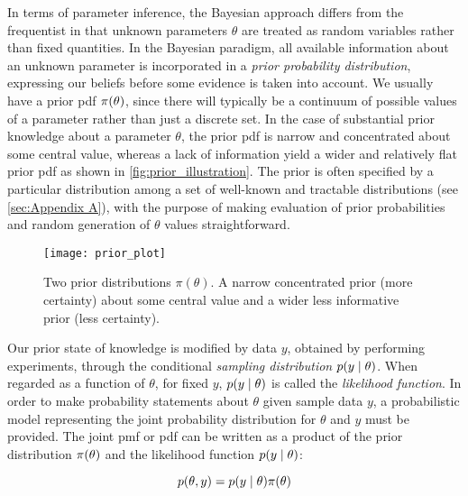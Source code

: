 In terms of parameter inference, the Bayesian approach differs from the frequentist in that unknown parameters $\theta$ are treated as random variables rather than fixed quantities. In the Bayesian paradigm, all available information about an unknown parameter is incorporated in a \textit{prior probability distribution}, expressing our beliefs before some evidence is taken into account. We usually have a prior pdf $\pi \qty(\theta)$, since there will typically be a continuum of possible values of a parameter rather than just a discrete set. In the case of substantial prior knowledge about a parameter $\theta$, the prior pdf is narrow and concentrated about some central value, whereas a lack of information yield a wider and relatively flat prior pdf as shown in \autoref{fig:prior_illustration}. The prior is often specified by a particular distribution among a set of well-known and tractable distributions (see \autoref{sec:Appendix A}), with the purpose of making evaluation of prior probabilities and random generation of $\theta$ values straightforward.



\begin{figure}[H]
    \centering
    \texttt{[image: prior\_plot]}
    \caption{Two prior distributions $\pi (\theta)$. A narrow concentrated prior (more certainty) about some central value and a wider less informative prior (less certainty).}
    \label{fig:prior_illustration}
\end{figure}

Our prior state of knowledge is modified by data $y$, obtained by performing experiments, through the conditional \textit{sampling distribution} $p \qty(y \mid \theta)$. When regarded as a function of $\theta$, for fixed $y$, $p \qty(y \mid \theta)$ is called the \textit{likelihood function}. In order to make probability statements about $\theta$ given sample data $y$, a probabilistic model representing the joint probability distribution for $\theta$ and $y$ must be provided. The joint pmf or pdf can be written as a product of the prior distribution $\pi \qty(\theta)$ and the likelihood function $p \qty(y \mid \theta)$:

\begin{equation*}
    p(\theta, y) = p \qty(y \mid \theta) \pi \qty(\theta) 
\end{equation*}

